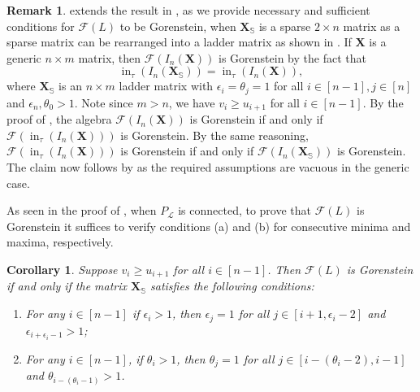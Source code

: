 \documentclass[11pt,a4paper,reqno,dvipsnames]{amsart}
\theoremstyle{plain}
\newtheorem{Corollary}[Theorem]{Corollary}
\theoremstyle{definition}
\newtheorem{Assumptions and Discussion}[Theorem]{Assumptions and Discussion}
\newtheorem{Remark}[Theorem]{Remark}
\theoremstyle{remark}
\def\ini{\operatorname{in}}
\newcommand\bfX{\mathbf{X}}
\newcommand\bfS{\mathbb{S}}
\newcommand\calF{\mathcal{F}}
\begin{document}
\begin{Remark}\label{rem:sparse}
 extends the result in \cite[Corollary~4.8]{CDFGLPS}, as we provide necessary and sufficient conditions for $\calF(L)$ to be Gorenstein, when $\bfX_{\bfS}$ is a sparse $2\times n$ matrix as a sparse matrix can be rearranged into a ladder matrix as shown in \cite[Corollary~4.8]{CDFGLPS}. 
If $\bfX$ is a generic $n \times m$ matrix, then $\calF(I_n(\bfX))$ is Gorenstein by the fact that 
\[
    \ini_{\tau}\!\left(I_n(\bfX_{\bfS})\right) = \ini_{\tau}\!\left(I_n(\bfX)\right),
\]
where $\bfX_{\bfS}$ is an $n\times m$ ladder matrix with $\epsilon_i=\theta_j=1$ for all $i\in [n-1], j\in [n]$ and $\epsilon_n, \theta_0>1$. Note since  $m>n$, we have $v_{i} \ge u_{i+1}$ for all $i \in [n-1]$.
By the proof of , the algebra $\calF(I_n(\bfX))$ is Gorenstein if and only if $\calF(\ini_{\tau}(I_n(\bfX)))$ is Gorenstein.  
By the same reasoning, $\calF(\ini_{\tau}(I_n(\bfX)))$ is Gorenstein if and only if $\calF(I_n(\bfX_{\bfS}))$ is Gorenstein.  
The claim now follows by  as the required assumptions are vacuous in the generic case.
\end{Remark}



As seen in the proof of , when $P_{\mathcal{L}}$ is connected, to prove  that $\calF(L)$ is Gorenstein it suffices to verify conditions (a) and (b) for consecutive minima and maxima, respectively. 

\begin{Corollary}\label{thm: Gor1ForEpsilon}
        Suppose $v_{i}\ge u_{i+1}$ for all $i\in [n-1]$.  Then 
    $\calF(L)$ is Gorenstein if and only if the matrix $\bfX_{\bfS}$ satisfies the following conditions:
    \begin{enumerate}[a]
        \item For any $i\in [n-1]$ if $\epsilon_i>1$, then $\epsilon_j=1$ for all $j\in [i+1, \epsilon_i-2]$ and $\epsilon_{i+\epsilon_i-1}>1$;

        \item For any $i\in [n-1]$, if $\theta_i>1$, then  $\theta_{j}=1$ for all $j\in [i-(\theta_i-2), i-1]$ and $\theta_{i-(\theta_i-1)}>1$.
    \end{enumerate}
\end{Corollary}
\end{document}
